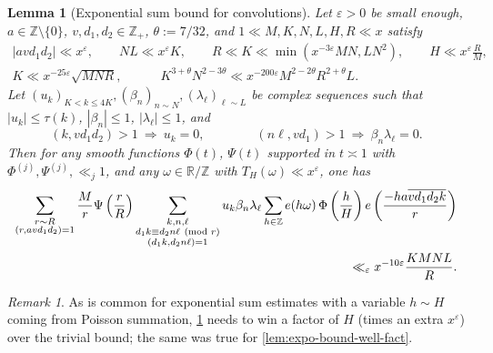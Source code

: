 \documentclass[reqno,11pt]{amsart}
\newtheorem{lemma}[theorem]{Lemma}
\theoremstyle{remark}
\newtheorem*{remark}{Remark}
\numberwithin{equation}{section}
\newcommand{\Z}{\mathbb{Z}}
\newcommand{\R}{\mathbb{R}}
\newcommand{\eps}{\varepsilon}
\renewcommand{\bar}{\overline}
\renewcommand{\pmod}[1]{\ (\textnormal{mod } #1)}
\begin{document}
\begin{lemma}[Exponential sum bound for convolutions] \label{lem:expo-bound-convo}
Let $\eps > 0$ be small enough, $a \in \Z \setminus \{0\}$, $v, d_1, d_2 \in \Z_+$, $\theta := 7/32$, and $1 \ll M, K, N, L, H, R \ll x$ satisfy 
\begin{equation} \label{eq:expo-convo-ranges}
\begin{gathered}    
    |avd_1d_2| \ll x^\eps, \qquad NL \ll x^\eps K, \qquad R \ll K \ll \min(x^{-3\eps} MN, LN^2),
    \qquad 
    H \ll x^\eps \frac{R}{M},
    \\
    K \ll x^{-25\eps} \sqrt{M N R}, \qquad\quad 
    K^{3+\theta} N^{2-3\theta} \ll x^{-200\eps} M^{2-2\theta} R^{2+\theta} L.
\end{gathered}
\end{equation}
Let $(u_k)_{K < k \le 4K}, (\beta_n)_{n \sim N}, (\lambda_\ell)_{\ell \sim L}$ be complex sequences such that $|u_k| \le \tau(k)$, $|\beta_n| \le 1$, $|\lambda_\ell| \le 1$, and
\[
    (k, vd_1d_2) > 1 \ \Rightarrow \ u_k = 0,
    \qquad\qquad 
    (n\ell, vd_1) > 1 \ \Rightarrow \ \beta_n \lambda_\ell = 0.
\]
Then for any smooth functions $\Phi(t)$, $\Psi(t)$ supported in $t \asymp 1$ with $\Phi^{(j)}, \Psi^{(j)}, \ll_j 1$, and any $\omega \in \R/\Z$ with $T_H(\omega) \ll x^\eps$, one has
\begin{equation} \label{eq:expo-bound-convo}
\begin{aligned}
    \sum_{\substack{r \sim R \\ (r, avd_1 d_2) = 1}}
    \frac{M}{r} \Psi\left(\frac{r}{R}\right)
    \sum_{\substack{k,n,\ell \\ d_1 k \equiv d_2 n\ell \pmod{r} \\ (d_1 k, d_2 n \ell) = 1}}
    u_k \beta_n \lambda_\ell 
    \sum_{h \in \Z} e(h\omega)\, \Phi\left(\frac{h}{H}\right) 
    e\left(\frac{-ha\bar{vd_1d_2k}}{r}\right)
    \\
    \ll_{\eps} 
    x^{-10\eps} \frac{KMNL}{R}.
\end{aligned}
\end{equation}
\end{lemma}

\begin{remark}
As is common for exponential sum estimates with a variable $h \sim H$ coming from Poisson summation, \cref{lem:expo-bound-convo} needs to win a factor of $H$ (times an extra $x^\eps$) over the trivial bound; the same was true for \cref{lem:expo-bound-well-fact}.
\end{remark}
\end{document}
